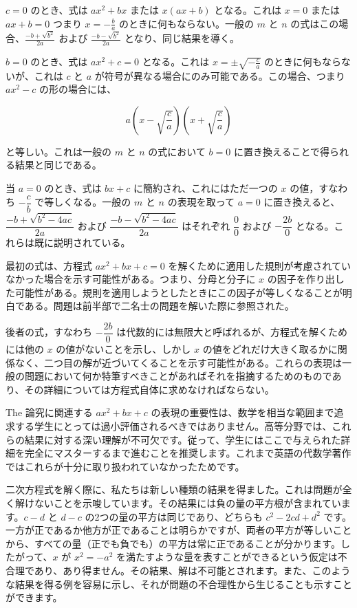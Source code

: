 \documentclass[a4paper,11pt,openany]{ltjsbook}
\begin{document}
$c = 0$ のとき、式は $ax^{2} + bx$ または $x(ax + b)$ となる。これは $x = 0$ または $ax + b = 0$ つまり $x = -\frac{b}{a}$ のときに何もならない。一般の $m$ と $n$ の式はこの場合、$\frac{-b + \sqrt{b^{2}}}{2a}$ および $\frac{-b - \sqrt{b^{2}}}{2a}$ となり、同じ結果を導く。

$b = 0$ のとき、式は $ax^{2} + c = 0$ となる。これは $x = \pm\sqrt{-\frac{c}{a}}$ のときに何もならないが、これは $c$ と $a$ が符号が異なる場合にのみ可能である。この場合、つまり $ax^{2} - c$ の形の場合には、

\[
a\left(x - \sqrt{\frac{c}{a}}\right)\left(x + \sqrt{\frac{c}{a}}\right)
\]

と等しい。これは一般の $m$ と $n$ の式において $b = 0$ に置き換えることで得られる結果と同じである。

当 $a = 0$ のとき、式は $bx + c$ に簡約され、これにはただ一つの $x$ の値，すなわち $-\dfrac{c}{b}$ で等しくなる。一般の $m$ と $n$ の表現を取って $a = 0$ に置き換えると、$\dfrac{-b + \sqrt{b^{2} - 4ac}}{2a}$ および $\dfrac{-b - \sqrt{b^{2} - 4ac}}{2a}$ はそれぞれ $\dfrac{0}{0}$ および $-\dfrac{2b}{0}$ となる。これらは既に説明されている。

最初の式は、方程式 $ax^{2} + bx + c = 0$ を解くために適用した規則が考慮されていなかった場合を示す可能性がある。つまり、分母と分子に $x$ の因子を作り出した可能性がある。規則を適用しようとしたときにこの因子が等しくなることが明白である。問題は前半部で二名士の問題を解いた際に参照された。

後者の式，すなわち $-\dfrac{2b}{0}$ は代数的には無限大と呼ばれるが、方程式を解くためには他の $x$ の値がないことを示し、しかし $x$ の値をどれだけ大きく取るかに関係なく、二つ目の解が近づいてくることを示す可能性がある。これらの表現は一般の問題において何か特筆すべきことがあればそれを指摘するためのものであり、その詳細については方程式自体に求めなければならない。

The 論究に関連する $ax^{2} + bx + c$ の表現の重要性は、数学を相当な範囲まで追求する学生にとっては過小評価されるべきではありません。高等分野では、これらの結果に対する深い理解が不可欠です。従って、学生にはここで与えられた詳細を完全にマスターするまで進むことを推奨します。これまで英語の代数学著作ではこれらが十分に取り扱われていなかったためです。

二次方程式を解く際に、私たちは新しい種類の結果を得ました。これは問題が全く解けないことを示唆しています。その結果には負の量の平方根が含まれています。$c - d$ と $d - c$ の2つの量の平方は同じであり、どちらも $c^{2} - 2cd + d^{2}$ です。一方が正であるか他方が正であることは明らかですが、両者の平方が等しいことから、すべての量（正でも負でも）の平方は常に正であることが分かります。したがって、$x$ が $x^{2} = -a^{2}$ を満たすような量を表すことができるという仮定は不合理であり、あり得ません。その結果、解は不可能とされます。また、このような結果を得る例を容易に示し、それが問題の不合理性から生じることも示すことができます。
\end{document}
